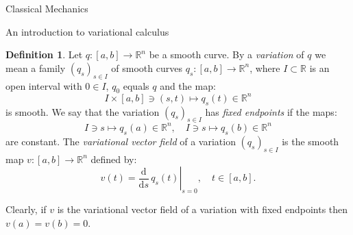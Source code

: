 \documentclass[oneside,a4paper,11pt]{amsbook}
\newcommand{\R}{\mathds R}
\newcommand{\dd}{\mathrm d}
\theoremstyle{remark}\newtheorem{exercise}{Exercise}[chapter]
\theoremstyle{plain}\newtheorem{teo}{Theorem}[section]
\theoremstyle{plain}\newtheorem{lem}[teo]{Lemma}
\theoremstyle{plain}\newtheorem{prop}[teo]{Proposition}
\theoremstyle{plain}\newtheorem{cor}[teo]{Corollary}
\theoremstyle{definition}\newtheorem{defin}[teo]{Definition}
\theoremstyle{remark}\newtheorem{rem}[teo]{Remark}
\theoremstyle{definition}\newtheorem{notation}[teo]{Notation}
\theoremstyle{definition}\newtheorem{convention}[teo]{Convention}
\theoremstyle{definition}\newtheorem{example}[teo]{Example}
\numberwithin{section}{chapter}
\numberwithin{equation}{section}
\begin{document}
\begin{chapter}{Classical Mechanics}
\begin{section}{An introduction to variational calculus}
\begin{defin}\label{thm:defvariation}
Let $q:[a,b]\to\R^n$ be a smooth curve. By a {\em variation\/} of $q$ we mean a family $(q_s)_{s\in I}$
of smooth curves $q_s:[a,b]\to\R^n$, where $I\subset\R$ is an open interval with $0\in I$,
$q_0$ equals $q$ and the map:
\[I\times[a,b]\ni(s,t)\longmapsto q_s(t)\in\R^n\]
is smooth. We say that the variation $(q_s)_{s\in I}$ has {\em fixed endpoints\/} if the maps:
\[I\ni s\longmapsto q_s(a)\in\R^n,\quad I\ni s\longmapsto q_s(b)\in\R^n\]
are constant. The {\em variational vector field\/} of a variation $(q_s)_{s\in I}$ is the smooth map
$v:[a,b]\to\R^n$ defined by:
\begin{equation}\label{eq:defvarvecfield}
v(t)=\left.\frac{\dd}{\dd s}\,q_s(t)\right\vert_{s=0},\quad t\in[a,b].
\end{equation}
\end{defin}
Clearly, if $v$ is the variational vector field of a variation with fixed endpoints then $v(a)=v(b)=0$.


\end{section}
\end{chapter}
\end{document}
